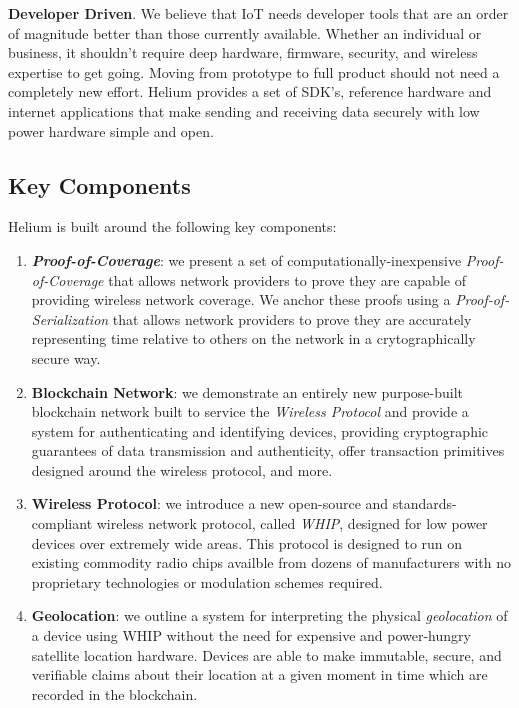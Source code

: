 \documentclass[letterpaper,11pt]{article}
\def\proofofcoverage/{\textit{Proof-of-Coverage}}
\begin{document}
\textbf{Developer Driven}. We believe that IoT needs developer tools that are an order of magnitude better than those currently available. Whether an individual or business, it shouldn't require deep hardware, firmware, security, and wireless expertise to get going. Moving from prototype to full product should not need a completely new effort. Helium provides a set of SDK's, reference hardware and internet applications that make sending and receiving data securely with low power hardware simple and open.

\subsection{Key Components}

Helium is built around the following key components:

\begin{enumerate}
  \item \textbf{\proofofcoverage/}: we present a set of computationally-inexpensive \proofofcoverage/ that allows network providers to prove they are capable of providing wireless network coverage. We anchor these proofs using a \textit{Proof-of-Serialization} that allows network providers to prove they are accurately representing time relative to others on the network in a crytographically secure way.
  
  \item \textbf{Blockchain Network}: we demonstrate an entirely new purpose-built blockchain network built to service the \textit{Wireless Protocol} and provide a system for authenticating and identifying devices, providing cryptographic guarantees of data transmission and authenticity, offer transaction primitives designed around the wireless protocol, and more.
  
	\item \textbf{Wireless Protocol}: we introduce a new open-source and standards-compliant wireless network protocol, called \textit{WHIP}, designed for low power devices over extremely wide areas. This protocol is designed to run on existing commodity radio chips availble from dozens of manufacturers with no proprietary technologies or modulation schemes required.
	
	\item \textbf{Geolocation}: we outline a system for interpreting the physical \textit{geolocation} of a device using WHIP without the need for expensive and power-hungry satellite location hardware. Devices are able to make immutable, secure, and verifiable claims about their location at a given moment in time which are recorded in the blockchain.
\end{enumerate}
\end{document}
